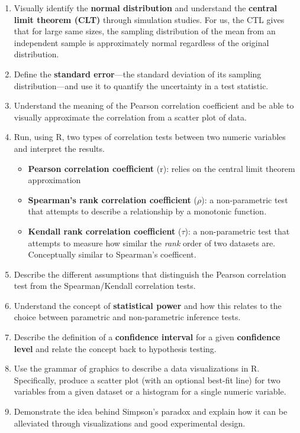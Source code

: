 \documentclass[11pt]{article}
\begin{document}
\begin{enumerate}
\item Visually identify the \textbf{normal distribution} and understand the
\textbf{central limit theorem (CLT)} through simulation studies. For us, the
CTL gives that for large same sizes, the sampling distribution of the mean
from an independent sample is approximately normal regardless of the original
distribution.

\item Define the \textbf{standard error}---the standard deviation of its
sampling distribution---and use it to quantify the uncertainty in a test
statistic.

\item Understand the meaning of the Pearson correlation coefficient and be
able to visually approximate the correlation from a scatter plot of data.

\item Run, using R, two types of correlation tests between two numeric
variables and interpret the results.
\begin{itemize}
\renewcommand{\labelitemi}{{\textcolor{dark}{{\tiny $\blacksquare$}}}}
\item \textbf{Pearson correlation coefficient} (r): relies on the central
limit theorem approximation
\item \textbf{Spearman's rank correlation coefficient} ($\rho$):
a non-parametric test that attempts to describe a relationship by a monotonic
function.
\item \textbf{Kendall rank correlation coefficient} ($\tau$):
a non-parametric test that attempts to measure how similar the \textit{rank}
order of two datasets are. Conceptually similar to Spearman's coefficent.
\end{itemize}

\item Describe the different assumptions that distinguish the Pearson correlation
test from the Spearman/Kendall correlation tests.

\item Understand the concept of \textbf{statistical power} and how this
relates to the choice between parametric and non-parametric inference tests.

\item Describe the definition of a \textbf{confidence interval} for a given
\textbf{confidence level} and relate the concept back to hypothesis testing.

\item Use the grammar of graphics to describe a data visualizations in R.
Specifically, produce a scatter plot (with an optional best-fit line) for
two variables from a given dataset or a histogram for a single numeric
variable.

\item Demonstrate the idea behind Simpson's paradox and explain how it can
be alleviated through visualizations and good experimental design.

\end{enumerate}
\end{document}
